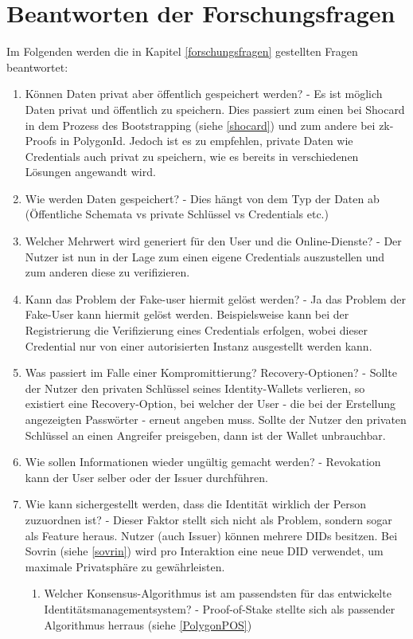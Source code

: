 \section{Beantworten der Forschungsfragen}
Im Folgenden werden die in Kapitel \ref{forschungsfragen} gestellten Fragen beantwortet:
\begin{enumerate}
	\item Können Daten privat aber öffentlich gespeichert werden? - Es ist möglich Daten privat und öffentlich zu speichern. Dies passiert zum einen bei Shocard in dem Prozess des Bootstrapping (siehe \ref{shocard}) und zum andere bei zk-Proofs in PolygonId. Jedoch ist es zu empfehlen, private Daten wie Credentials auch privat zu speichern, wie es bereits in verschiedenen Lösungen angewandt wird.
	\item Wie werden Daten gespeichert? - Dies hängt von dem Typ der Daten ab (Öffentliche Schemata vs private Schlüssel vs Credentials etc.)
	\item  Welcher Mehrwert wird generiert für den User und die Online-Dienste? - Der Nutzer ist nun in der Lage zum einen eigene Credentials auszustellen und zum anderen diese zu verifizieren.
	\item Kann das Problem der Fake-user hiermit gelöst werden? - Ja das Problem der Fake-User kann hiermit gelöst werden. Beispielsweise kann bei der Registrierung die Verifizierung eines Credentials erfolgen, wobei dieser Credential nur von einer autorisierten Instanz ausgestellt werden kann.
	\item Was passiert im Falle einer Kompromittierung?  Recovery-Optionen? - Sollte der Nutzer den privaten Schlüssel seines Identity-Wallets verlieren, so existiert eine Recovery-Option, bei welcher der User - die bei der Erstellung angezeigten Passwörter - erneut angeben muss. Sollte der Nutzer den privaten Schlüssel an einen Angreifer preisgeben, dann ist der Wallet unbrauchbar.
	\item Wie sollen Informationen wieder ungültig gemacht werden? - Revokation kann der User selber oder der Issuer durchführen.
	\item Wie kann sichergestellt werden, dass die Identität wirklich der Person zuzuordnen ist? - Dieser Faktor stellt sich nicht als Problem, sondern sogar als Feature heraus. Nutzer (auch Issuer) können mehrere DIDs besitzen. Bei Sovrin (siehe \ref{sovrin}) wird pro Interaktion eine neue DID verwendet, um maximale Privatsphäre zu gewährleisten.
	\begin{enumerate}
		\item Welcher Konsensus-Algorithmus ist am passendsten für das entwickelte Identitätsmanagementsystem? - Proof-of-Stake stellte sich als passender Algorithmus herraus (siehe \ref{PolygonPOS})

\end{enumerate}
\end{enumerate}
